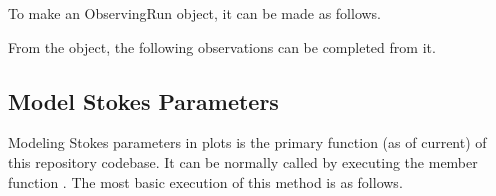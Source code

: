 \documentclass[letterpaper,10pt,english]{sphinxmanual}
\begin{document}
To make an ObservingRun object, it can be made as follows.

%
\begin{sphinxVerbatim}[commandchars=\\\{\}]
   

  

  
\end{sphinxVerbatim}

From the {\hyperref[\detokenize{model_observing:model_observing.ObservingRun}]{}} object, the following observations can be completed from it.


\subsection{Model Stokes Parameters}
\label{\detokenize{quickstart:model-stokes-parameters}}
Modeling Stokes parameters in plots is the primary function (as of current) of this repository codebase. It can be normally called by executing the member function {\hyperref[\detokenize{model_observing:model_observing.ObservingRun.Stokes_parameter_contours}]{}}. The most basic execution of this method is as follows.

%
\begin{sphinxVerbatim}[commandchars=\\\{\}]
   

  

  
\end{sphinxVerbatim}
\end{document}
